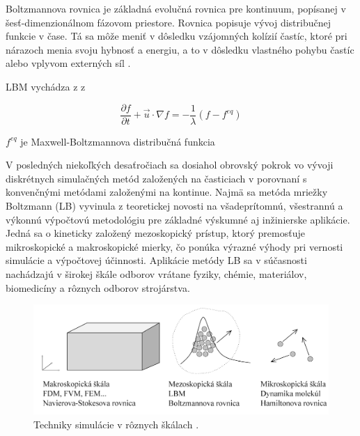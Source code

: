 \documentclass[]{tukediphc}
\begin{document}
\citep{delbosc2015}


Boltzmannova rovnica je základná evolučná rovnica pre kontinuum, popísanej v šesť-dimenzionálnom fázovom priestore. Rovnica popisuje vývoj distribučnej funkcie v čase. Tá sa môže meniť v dôsledku vzájomných kolízií častíc, ktoré pri nárazoch menia svoju hybnosť a energiu, a to v dôsledku vlastného pohybu častíc alebo vplyvom externých síl \citep{HEIDLER2011thesis}.

LBM vychádza z z 


\begin{equation}
\frac{\partial f}{\partial t} + \vec{u} \cdot \nabla f = - \frac{1}{\lambda} \left(f-f^{eq} \right)
\end{equation}

$f^{eq}$ je Maxwell-Boltzmannova distribučná funkcia


V posledných niekoľkých desaťročiach sa dosiahol obrovský pokrok vo vývoji diskrétnych simulačných metód založených na časticiach v porovnaní s konvenčnými metódami založenými na kontinue. Najmä sa metóda mriežky Boltzmann (LB) vyvinula z teoretickej novosti na všadeprítomnú, všestrannú a výkonnú výpočtovú metodológiu pre základné výskumné aj inžinierske aplikácie. Jedná sa o kineticky založený mezoskopický prístup, ktorý premosťuje mikroskopické a makroskopické mierky, čo ponúka výrazné výhody pri vernosti simulácie a výpočtovej účinnosti. Aplikácie metódy LB sa v súčasnosti nachádzajú v širokej škále odborov vrátane fyziky, chémie, materiálov, biomedicíny a rôznych odborov strojárstva.

\begin{figure}[!ht]
	\centering
	\includegraphics[width=1\textwidth,angle=0]{figures/different-scales.png}
	\caption{Techniky simulácie v rôznych škálach \citep{Mele2013}.}
\end{figure}
\end{document}
